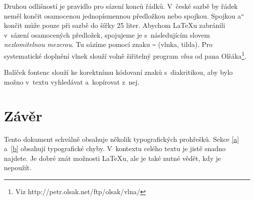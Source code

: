 \documentclass[a4paper, twocolumn, 10pt]{article}[23.02.2018]
\newcommand{\myuv}[1]{\quotedblbase #1\textquotedblleft}
\begin{document}
Druhou odlišností je pravidlo pro sázení konců řádků. V~české sazbě by řádek neměl končit osamocenou jednopísmennou předložkou nebo spojkou. Spojkou \myuv{a} končit může pouze při sazbě do šířky 25 liter. Abychom \LaTeX u zabránili v~sázení osamocených předložek, spojujeme je s~následujícím slovem \textit{nezlomitelnou mezerou}. Tu sázíme pomocí znaku \verb|~| (vlnka, tilda). Pro systematické doplnění vlnek slouží volně šiřitelný program \textit{vlna} od pana Olšáka\footnote{Viz {\ttfamily http://petr.olsak.net/ftp/olsak/vlna/}}.

Balíček {\ttfamily fontenc} slouží ke korektnímu kódovaní znaků s~diakritikou, aby bylo možno v~textu vyhledávat a~kopírovat z~nej.

\section{Závěr}

Tento dokument schválně obsahuje několik typografických prohřešků. Sekce \ref{a} a~\ref{b} obsahují typografické chyby. V~kontextu celého textu je jistě snadno najdete. Je dobré znát možnosti \LaTeX u, ale je také nutné vědět, kdy je nepoužít.
\end{document}
